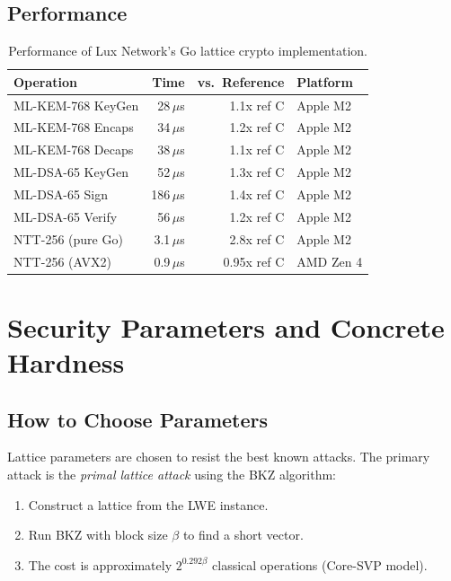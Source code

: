 \documentclass[11pt,a4paper]{article}
\begin{document}
\subsection{Performance}

\begin{table}[H]
\centering
\small
\begin{tabular}{@{}lrrl@{}}
\toprule
\textbf{Operation} & \textbf{Time} & \textbf{vs.\ Reference} & \textbf{Platform} \\
\midrule
ML-KEM-768 KeyGen & 28\,$\mu$s & 1.1x ref C & Apple M2 \\
ML-KEM-768 Encaps & 34\,$\mu$s & 1.2x ref C & Apple M2 \\
ML-KEM-768 Decaps & 38\,$\mu$s & 1.1x ref C & Apple M2 \\
ML-DSA-65 KeyGen & 52\,$\mu$s & 1.3x ref C & Apple M2 \\
ML-DSA-65 Sign & 186\,$\mu$s & 1.4x ref C & Apple M2 \\
ML-DSA-65 Verify & 56\,$\mu$s & 1.2x ref C & Apple M2 \\
NTT-256 (pure Go) & 3.1\,$\mu$s & 2.8x ref C & Apple M2 \\
NTT-256 (AVX2) & 0.9\,$\mu$s & 0.95x ref C & AMD Zen 4 \\
\bottomrule
\end{tabular}
\caption{Performance of Lux Network's Go lattice crypto implementation.}
\end{table}

\section{Security Parameters and Concrete Hardness}

\subsection{How to Choose Parameters}

Lattice parameters are chosen to resist the best known attacks. The primary attack is
the \emph{primal lattice attack} using the BKZ algorithm:

\begin{enumerate}[nosep]
  \item Construct a lattice from the LWE instance.
  \item Run BKZ with block size $\beta$ to find a short vector.
  \item The cost is approximately $2^{0.292\beta}$ classical operations (Core-SVP model).
\end{enumerate}
\end{document}
